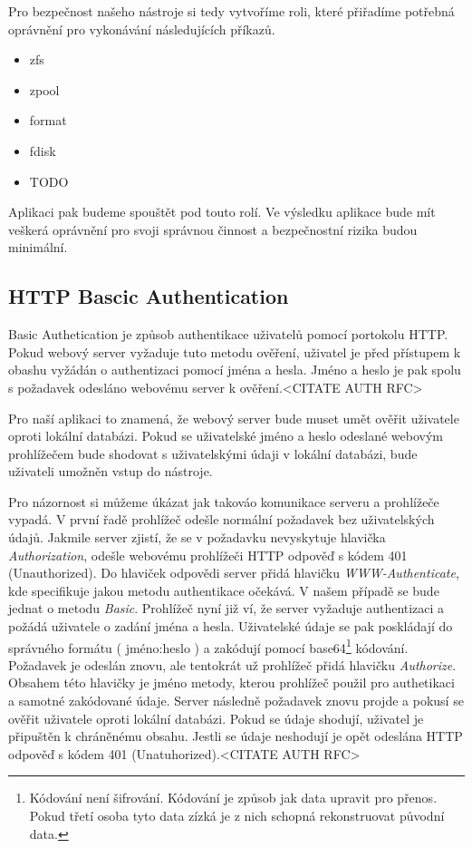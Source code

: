     Pro bezpečnost našeho nástroje si tedy vytvoříme roli, které přiřadíme potřebná oprávnění pro vykonávání následujících příkazů.
    \begin{itemize}
      \item zfs
      \item zpool
      \item format
      \item fdisk
      \item TODO
    \end{itemize}

    Aplikaci pak budeme spouštět pod touto rolí. Ve výsledku aplikace bude mít veškerá oprávnění pro svoji správnou činnost a bezpečnostní rizika budou minimální.
    \subsection{HTTP Bascic Authentication}
    \label{httpauth}
    Basic Authetication je způsob authentikace uživatelů pomocí portokolu HTTP. Pokud webový server vyžaduje tuto metodu ověření, uživatel je před přístupem k obashu vyžádán o authentizaci pomocí jména a hesla. Jméno a heslo je pak spolu s požadavek odesláno webovému server k ověření.<CITATE AUTH RFC>

    Pro naší aplikaci to znamená, že webový server bude muset umět ověřit uživatele oproti lokální databázi. Pokud se uživatelské jméno a heslo odeslané webovým prohlížečem bude shodovat s uživatelskými údaji v lokální databázi, bude uživateli umožněn vstup do nástroje.

    Pro názornost si můžeme úkázat jak takováo komunikace serveru a prohlížeče vypadá. V první řadě prohlížeč odešle normální požadavek bez uživatelských údajů. Jakmile server zjistí, že se v požadavku nevyskytuje hlavička \emph{Authorization}, odešle webovému prohlížeči HTTP odpověď s kódem 401 (Unauthorized). Do hlaviček odpovědi server přidá hlavičku \emph{WWW-Authenticate}, kde specifikuje jakou metodu authentikace očekává. V našem případě se bude jednat o metodu \emph{Basic}. Prohlížeč nyní již ví, že server vyžaduje authentizaci a požádá uživatele o zadání jména a hesla. Uživatelské údaje se pak poskládají do správného formátu ( jméno:heslo ) a zakódují pomocí base64\footnote{Kódování není šifrování. Kódování je způsob jak data upravit pro přenos. Pokud třetí osoba tyto data zízká je z nich schopná rekonstruovat původní data.} kódování. Požadavek je odeslán znovu, ale tentokrát už prohlížeč přidá hlavičku \emph{Authorize}. Obsahem této hlavičky je jméno metody, kterou prohlížeč použil pro authetikaci a samotné zakódované údaje. Server následně požadavek znovu projde a pokusí se ověřit uživatele oproti lokální databázi. Pokud se údaje shodují, uživatel je připuštěn k chráněnému obsahu. Jestli se údaje neshodují je opět odeslána HTTP odpověď s kódem 401 (Unatuhorized).<CITATE AUTH RFC>

